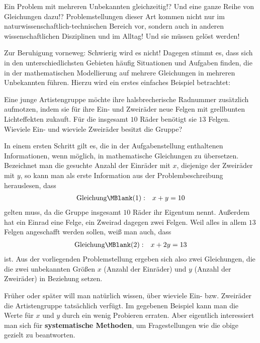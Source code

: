 
\MSetSubject{\MINTMathematics}

\Mtikzexternalize




\begin{MSectionStart}

\MModstartBox
\end{MSectionStart}



\begin{MIntro}
Ein Problem mit mehreren Unbekannten gleichzeitig!? Und eine ganze Reihe von Gleichungen dazu!? Problemstellungen dieser Art kommen nicht nur im naturwissenschaftlich-technischen Bereich vor, sondern auch in anderen wissenschaftlichen Disziplinen und im Alltag! Und sie müssen gelöst werden!

Zur Beruhigung vorneweg: Schwierig wird es nicht! Dagegen stimmt es, dass sich in den unterschiedlichsten
Gebieten häufig Situationen und Aufgaben finden, die in der mathematischen Modellierung auf mehrere Gleichungen
in mehreren Unbekannten führen.
Hierzu wird ein erstes einfaches Beispiel betrachtet:
\begin{MExample}
Eine junge Artistengruppe möchte ihre halsbrecherische Radnummer zusätzlich aufmotzen, indem sie für ihre Ein- und Zweiräder
neue Felgen mit grellbunten Lichteffekten zukauft. Für die insgesamt $10$ Räder benötigt sie $13$ Felgen.
Wieviele Ein- und wieviele Zweiräder besitzt die Gruppe?

In einem ersten Schritt gilt es, die in der Aufgabenstellung enthaltenen Informationen, wenn möglich, in mathematische
Gleichungen zu übersetzen. Bezeichnet man die gesuchte Anzahl der Einräder mit $x$, diejenige der Zweiräder mit $y$,
so kann man als erste Information aus der Problembeschreibung herauslesen, dass
\begin{eqnarray*}
\mbox{Gleichung}\MBlank (1) & : & x + y = 10
\end{eqnarray*}
gelten muss, da die Gruppe insgesamt $10$ Räder ihr Eigentum nennt. Außerdem hat ein Einrad eine Felge, ein Zweirad dagegen
zwei Felgen. Weil alles in allem $13$ Felgen angeschafft werden sollen, weiß man auch, dass
\begin{eqnarray*}
\mbox{Gleichung}\MBlank (2) & : & x + 2 y = 13
\end{eqnarray*}
ist. Aus der vorliegenden Problemstellung ergeben sich also zwei Gleichungen, die die zwei unbekannten Größen
$x$ (Anzahl der Einräder) und $y$ (Anzahl der Zweiräder) in Beziehung setzen.
\end{MExample}
Früher oder später will man natürlich wissen, über wieviele Ein- bzw. Zweiräder die Artistengruppe tatsächlich verfügt. Im
gegebenen Beispiel kann man die Werte für $x$ und $y$ durch ein wenig Probieren erraten. Aber
eigentlich interessiert man sich für \textbf{systematische Methoden}, um Fragestellungen wie die obige
gezielt zu beantworten.

\end{MIntro}

